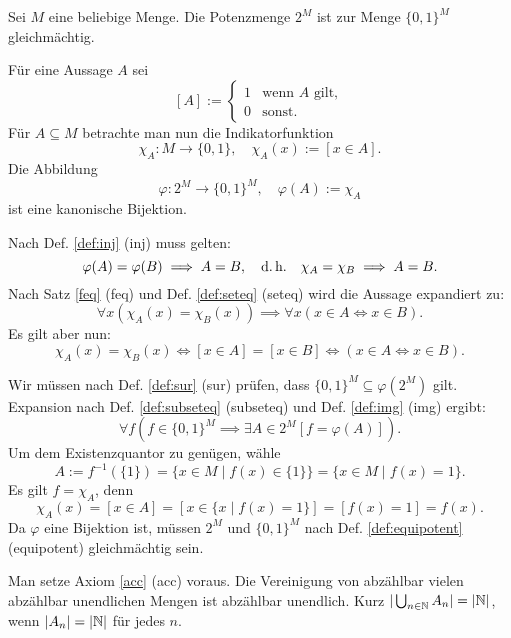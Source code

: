 \begin{Satz}
Sei $M$ eine beliebige Menge. Die Potenzmenge $2^M$ ist zur
Menge $\{0,1\}^M$ gleichmächtig.
\end{Satz}

\begin{Beweis}
Für eine Aussage $A$ sei
\[[A] := \begin{cases}
1&\text{wenn $A$ gilt},\\
0&\text{sonst}.
\end{cases}\]
Für $A\subseteq M$ betrachte man nun die
Indikatorfunktion
\[\chi_A\colon M\to\{0,1\},\quad \chi_A(x):=[x\in A].\]
Die Abbildung
\[\varphi\colon 2^M\to \{0,1\}^M,\quad \varphi(A):=\chi_A\]
ist eine kanonische Bijektion.

Nach Def. \ref{def:inj} (inj) muss gelten:
\[\varphi(A)=\varphi(B)\implies A=B,\quad\text{d.\,h.}\quad
\chi_A=\chi_B \implies A=B.\]
Nach Satz \ref{feq} (feq) und Def. \ref{def:seteq} (seteq)
wird die Aussage expandiert zu:
\[\forall x(\chi_A(x)=\chi_B(x))\implies \forall x(x\in A\iff x\in B).\]
Es gilt aber nun:
\[\chi_A(x)=\chi_B(x)\iff [x\in A]=[x\in B] \iff (x\in A\iff x\in B).\]
\end{Beweis}
 Wir müssen nach Def. \ref{def:sur} (sur)
prüfen, dass $\{0,1\}^M\subseteq \varphi(2^M)$ gilt.
Expansion nach Def. \ref{def:subseteq} (subseteq) und
Def. \ref{def:img} (img)
ergibt:
\[\forall f(f\in \{0,1\}^M\implies\exists A{\in}2^M[f=\varphi(A)]).\]
Um dem Existenzquantor zu genügen, wähle
\[A := f^{-1}(\{1\}) = \{x\in M\mid f(x)\in \{1\}\} = \{x\in M\mid f(x)=1\}.\]
Es gilt $f=\chi_A$, denn
\[\chi_A(x) = [x\in A] = [x\in\{x\mid f(x)=1\}] = [f(x)=1] = f(x).\]
Da $\varphi$ eine Bijektion ist, müssen $2^M$ und $\{0,1\}^M$
nach Def. \ref{def:equipotent} (equipotent) gleichmächtig
sein.\,\qedsymbol

\newpage
\begin{Satz}\label{countable-union-countable}
Man setze Axiom \ref{acc} (acc) voraus.
Die Vereinigung von abzählbar vielen abzählbar unendlichen Mengen
ist abzählbar unendlich. Kurz $|\bigcup_{n\in\mathbb N} A_n| = |\mathbb N|$, wenn
$|A_n|=|\mathbb N|$ für jedes $n$.
\end{Satz}

